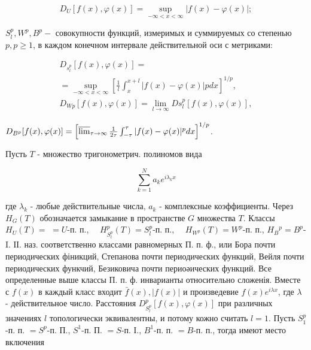 \documentclass[10pt]{article}
\begin{document}
\[

D_{U}[f(x), \varphi(x)]=\sup _{-\infty<x<\infty}|f(x)-\varphi(x)| ;

\]



$S_{l}^{p}, W^{p}, B^{p}-$ совокупности функций, измеримых и суммируемых со степенью $p, p \geqslant 1$, в каждом конечном интервале действительной оси с метриками:



\[

\begin{gathered}

D_{s_{l}^{p}}[f(x), \varphi(x)]= \\

=\sup _{-\infty<x<\infty}\left[\frac{1}{l} \int_{x}^{x+l}|f(x)-\varphi(x)| p d x\right]^{1 / p}, \\

D_{W p}[f(x), \varphi(x)]=\lim _{l \rightarrow \infty} D s_{l}^{p}[f(x), \varphi(x)],

\end{gathered}

\]



$D_{B^{p}}[f(x), \varphi(x)]=\left[\varlimsup_{\tau \rightarrow \infty} \frac{1}{2 \tau} \int_{-\tau}^{\tau}|f(x)-\varphi(x)|^{p} d x\right]^{1 / p}$.



Пусть $T$ - множество тригонометрич. полиномов вида



\[

\sum_{k=1}^{N} a_{k} e^{i \lambda_{k} x}

\]



где $\lambda_{k}$ - любые действительные числа, $a_{k}$ - комплексные коэффициенты. Через $H_{G}(T)$ обозначается замыкание в пространстве $G$ множества $T$. Классы $H_{U}(T)=$ $=U$-п. п., $\quad H_{S_{l}^{p}}^{p}(T)=S_{l}^{p}$-п. п., $\quad H_{W^{p}}(T)=W^{p}$-п. п., $H_{B}{ }^{p}=B^{p}$-I. ІІ. наз. соответственно классами равномерных П. п. ф., или Бора почти периодических фіникций, Степанова почти периодических функций, Вейля почти периодических функчий, Безиковича почти периоәических функций. Все определенные выше классы П. п. ф. инварианты относительно сложенія. Вместе с $f(x)$ в каждый класс входит $\bar{f}(x),|f(x)|$ и произведевие $f(x) e^{i \lambda x}$, где $\lambda$ - действительное число. Расстояния $D_{S_{l}^{p}}^{p}[f(x), \varphi(x)]$ при различных значениях $l$ топологически эквивалентны, и потому кожно считать $l=1$. Пусть $S_{1}^{p}$-п. п. $=S^{p}$-п. П., $S^{1}$-п. П. $=S$-п. І., $B^{1}$-п. п. $=B$-п. п., тогда имеют место включения
\end{document}
